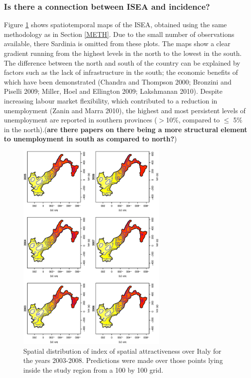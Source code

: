 \documentclass[10pt]{article}
\theoremstyle{definition}
\theoremstyle{plain}
\begin{document}
\subsubsection{Is there a connection between ISEA and incidence? \label{nexus}}

Figure \ref{fig5} shows spatiotemporal maps of the ISEA, obtained using the same methodology as in Section \ref{METH}. Due to the small number of observations available, there Sardinia is omitted from these plots. The maps show a clear gradient running from the highest levels in the north to the lowest in the south. The difference between the north and south of the country can be explained by factors such as the lack of infrastructure in the south; the economic benefits of which have been demonstrated (Chandra and Thompson 2000; Bronzini and Piselli 2009; Miller, Hoel and Ellington 2009; Lakshmanan 2010). Despite increasing labour market flexibility, which contributed to a reduction in unemployment (Zanin and Marra 2010), the highest and most persistent levels of unemployment are reported in southern provinces ($>$10\%, compared to $\leq$ 5\% in the north).(\textbf{are there papers on there being a more structural element to unemployment in south as compared to north?})

\begin{figure}[tbp]
	\centering
		\includegraphics[width=0.66\textwidth, angle=270]{index.eps}
	\caption{Spatial distribution of index of spatial attractiveness over Italy for the years 2003-2008. Predictions were made over those points lying inside the study region from a 100 by 100 grid.}
	\label{fig5}
\end{figure}
\end{document}
